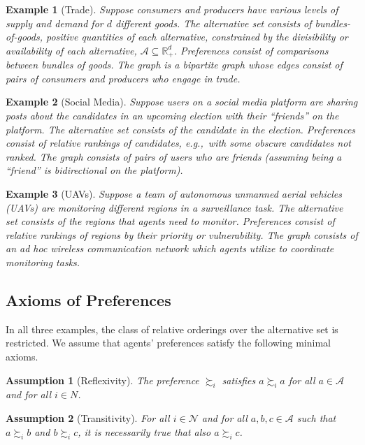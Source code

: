 \documentclass[conference]{ieeeconf}
\newcommand{\R}{\mathbb{R}}
\newcommand{\N}{\mathcal{N}}
\newcommand{\A}{\mathcal{A}}
\newcommand{\prefers}{\succsim}
\newtheorem{assumption}{Assumption}
\newtheorem{example}{Example}
\begin{document}
\begin{example}[Trade]
    Suppose consumers and producers have various levels of supply and demand for $d$ different goods. The alternative set consists of  bundles-of-goods, positive quantities of each alternative, constrained by the divisibility or availability of each alternative, $\A \subseteq \R^{d}_{+}$. Preferences consist of comparisons between bundles of goods. The graph is a bipartite graph whose edges consist of pairs of consumers and producers who engage in trade.
\end{example}
\begin{example}[Social Media]
    Suppose users on a social media platform are sharing posts about the candidates in an upcoming election with their ``friends'' on the platform. The alternative set consists of the candidate in the election.
    Preferences consist of relative rankings of candidates, e.g.,~with some obscure candidates not ranked. The graph consists of pairs of users who are friends (assuming being a ``friend'' is bidirectional on the platform).
\end{example}
\begin{example}[UAVs]
    Suppose a team of autonomous unmanned aerial vehicles (UAVs) are monitoring different regions in a surveillance task. The alternative set consists of the regions that agents need to monitor. Preferences consist of relative rankings of regions by their priority or vulnerability. The graph consists of an \emph{ad hoc} wireless communication network which agents utilize to coordinate monitoring tasks.
\end{example}

\subsection{Axioms of Preferences}

In all three examples, the class of relative orderings over the alternative set is restricted. We assume that agents' preferences satisfy the following minimal axioms.

\begin{assumption}[Reflexivity] \label{ass:reflexivity}
    The preference $\prefers_i$ satisfies $a \prefers_i a$ for all $a \in \A$ and for all $i \in N$.
\end{assumption}
\begin{assumption}[Transitivity]\label{ass:transitivity}
    For all $i \in \N$ and for all $a, b, c \in \A$ such that $a \prefers_i b$ and $b \prefers_i c$, it is necessarily true that also $a \prefers_i c$.
\end{assumption}
\end{document}
